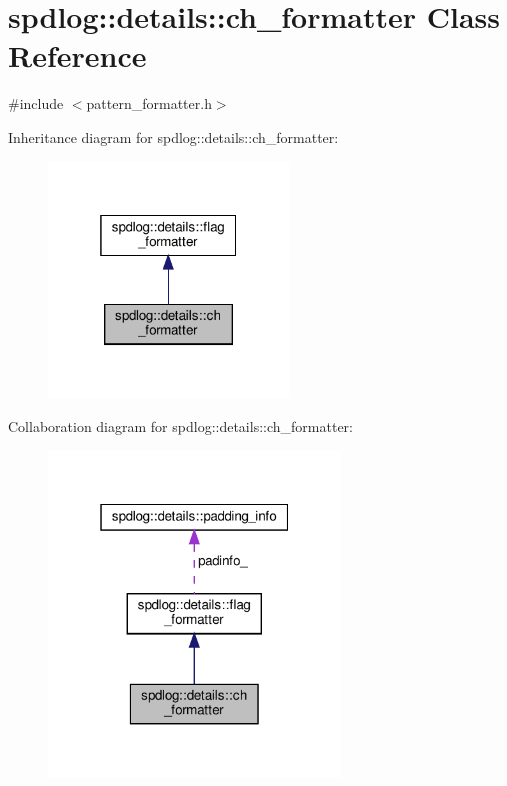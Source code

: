 \hypertarget{classspdlog_1_1details_1_1ch__formatter}{}\section{spdlog\+:\+:details\+:\+:ch\+\_\+formatter Class Reference}
\label{classspdlog_1_1details_1_1ch__formatter}


{\ttfamily \#include $<$pattern\+\_\+formatter.\+h$>$}



Inheritance diagram for spdlog\+:\+:details\+:\+:ch\+\_\+formatter\+:
\nopagebreak
\begin{figure}[H]
\begin{center}
\leavevmode
\includegraphics[width=181pt]{classspdlog_1_1details_1_1ch__formatter__inherit__graph}
\end{center}
\end{figure}


Collaboration diagram for spdlog\+:\+:details\+:\+:ch\+\_\+formatter\+:
\nopagebreak
\begin{figure}[H]
\begin{center}
\leavevmode
\includegraphics[width=220pt]{classspdlog_1_1details_1_1ch__formatter__coll__graph}
\end{center}
\end{figure}
